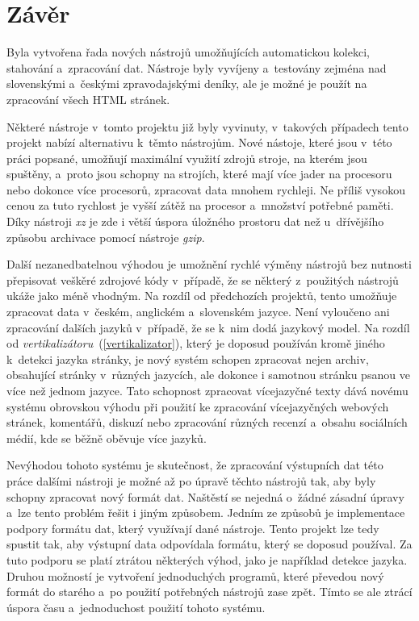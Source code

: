 \chapter{Závěr}
Byla vytvořena řada nových nástrojů umožňujících automatickou kolekci, stahování a~zpracování dat. Nástroje byly vyvíjeny a~testovány zejména nad slovenskými a~českými zpravodajskými deníky, ale je možné je použít na zpracování
všech HTML stránek.

Některé nástroje v~tomto projektu již byly vyvinuty, v~takových případech tento projekt
nabízí alternativu k~těmto nástrojům. Nové nástoje, které jsou v~této práci popsané,
umožňují maximální využití zdrojů stroje, na kterém jsou spuštěny, a~proto jsou
schopny na strojích, které mají více jader na procesoru nebo dokonce více procesorů,
zpracovat data mnohem rychleji. Ne příliš vysokou cenou za tuto rychlost je vyšší
zátěž na procesor a~množství potřebné paměti. Díky nástroji \textit{xz} je
zde i větší úspora úložného prostoru dat než u~dřívějšího způsobu archivace pomocí
nástroje \textit{gzip}.

Další nezanedbatelnou výhodou je umožnění rychlé výměny nástrojů bez nutnosti přepisovat veškěré
zdrojové kódy v~případě, že se některý z~použitých nástrojů ukáže jako méně vhodným.
Na rozdíl od předchozích projektů, tento umožňuje zpracovat data v~českém, anglickém a~slovenském jazyce. Není vyloučeno ani zpracování dalších jazyků v~případě, že se
k~nim dodá jazykový model. Na rozdíl od \textit{vertikalizátoru}~(\ref{vertikalizator}),
který je doposud používán kromě jiného k~detekci jazyka stránky, je nový systém schopen zpracovat
nejen archiv, obsahující stránky v~různých jazycích, ale dokonce i samotnou stránku psanou
ve více než jednom jazyce. Tato schopnost zpracovat vícejazyčné texty dává novému
systému obrovskou výhodu při použití ke zpracování vícejazyčných webových stránek,
komentářů, diskuzí nebo zpracování různých recenzí a~obsahu sociálních médií, kde se běžně
oběvuje více jazyků.

Nevýhodou tohoto systému je skutečnost, že zpracování výstupních dat této práce dalšími nástroji
je možné až po úpravě těchto nástrojů tak, aby byly schopny zpracovat nový formát dat.
Naštěstí se nejedná o~žádné zásadní úpravy a~lze tento problém řešit i jiným způsobem. Jedním ze
způsobů je implementace podpory formátu dat, který využívají dané nástroje. Tento projekt
lze tedy spustit tak, aby výstupní data odpovídala formátu, který se doposud používal.
Za tuto podporu se platí ztrátou některých výhod, jako je například detekce
jazyka. Druhou možností je vytvoření jednoduchých programů, které převedou nový formát
do starého a~po použití potřebných nástrojů zase zpět. Tímto se ale ztrácí úspora času
a~jednoduchost použití tohoto systému.
